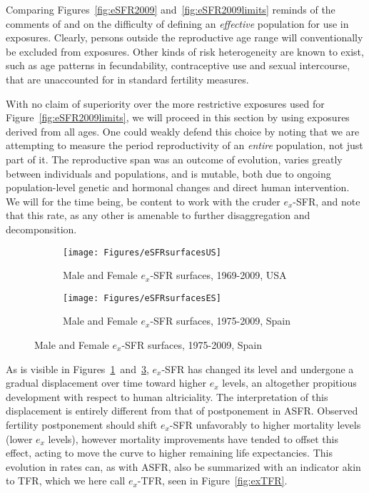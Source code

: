 Comparing Figures~\ref{fig:eSFR2009} and~\ref{fig:eSFR2009limits} reminds of the
comments of \citet{gupta1978alternative} and \citet{mitra1976effect} on the difficulty of
defining an \textit{effective} population for use in exposures. Clearly, persons
outside the reproductive age range will conventionally be excluded from
exposures. Other kinds of risk heterogeneity are known to exist, such as age
patterns in fecundability, contraceptive use and sexual intercourse, that are
unaccounted for in standard fertility measures. 

With no claim of superiority over the more
restrictive exposures used for Figure~\ref{fig:eSFR2009limits}, we will proceed
in this section by using exposures derived from all ages. One could weakly
defend this choice by noting that we are attempting to measure the period
reproductivity of an \textit{entire} population, not just part of it. The
reproductive span was an outcome of evolution, varies greatly between
individuals and populations, and is mutable, both due to ongoing
population-level genetic and hormonal changes and direct human intervention. We
will for the time being, be content to work with the cruder $e_x$-SFR, and note
that this rate, as any other is amenable to further disaggregation and
decomponsition.

\begin{figure}
        \centering
        \begin{subfigure}
                \centering
                \caption{Male and Female $e_x$-SFR surfaces, 1969-2009, USA}
                \texttt{[image: Figures/eSFRsurfacesUS]}
                \label{fig:exSFRsurfUS}
        \end{subfigure}
        \begin{subfigure}
                \centering
                \caption{Male and Female $e_x$-SFR surfaces, 1975-2009, Spain}
                \texttt{[image: Figures/eSFRsurfacesES]} 
                \label{fig:exSFRsurfES}
        \end{subfigure}
\end{figure}

As is visible in Figures~\ref{fig:exSFRsurfUS}~and~\ref{fig:exSFRsurfES}, 
$e_x$-SFR has changed its level and undergone a gradual displacement over 
time toward higher $e_x$ levels, an altogether propitious development
with respect to human altriciality. The interpretation of this displacement is
entirely different from that of postponement in ASFR. Observed fertility 
postponement should shift $e_x$-SFR unfavorably to higher mortality 
levels (lower $e_x$ levels), however mortality improvements have tended to 
offset this effect, acting to move the curve to higher
remaining life expectancies. This evolution in rates can, as with ASFR, also be
summarized with an indicator akin to TFR, which we here call $e_x$-TFR, seen in
Figure~\ref{fig:exTFR}.

